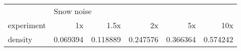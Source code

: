 \begin{tabular}{lrrrrr}
\toprule
{} & \multicolumn{5}{l}{Snow noise} \\
experiment &         1x &      1.5x &        2x &        5x &       10x \\
\midrule
density &   0.069394 &  0.118889 &  0.247576 &  0.366364 &  0.574242 \\
\bottomrule
\end{tabular}
